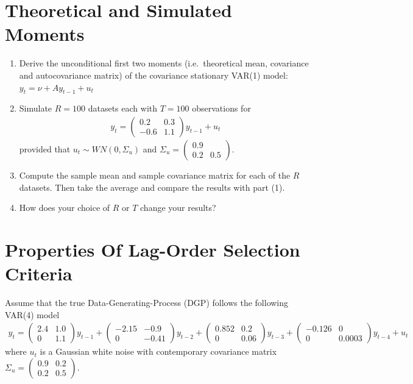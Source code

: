 \documentclass{article}
\begin{document}
\section[Theoretical and Simulated Moments]{Theoretical and Simulated Moments\label{ex:TheoreticalAndSimulatedMoments}}
\begin{enumerate}
 	\item Derive the unconditional first two moments (i.e.\ theoretical mean, covariance and autocovariance matrix) of the covariance stationary VAR{(1)} model: \(y_t = \nu + A y_{t-1} + u_t\)
 	\item Simulate \(R=100\) datasets each with \(T=100\) observations for
 	\begin{align*}
 	y_t = \begin{pmatrix}0.2 &0.3 \\-0.6 & 1.1 \end{pmatrix} y_{t-1}  + u_t
 	\end{align*}
 	provided that \(u_t \sim WN(0,\Sigma_u)\) and \(\Sigma_u = \begin{pmatrix}0.9 &  \\ 0.2 & 0.5 \end{pmatrix}\).
	\item Compute the sample mean and sample covariance matrix for each of the \(R\) datasets.
	Then take the average and compare the results with part (1).
	\item How does your choice of \(R\) or \(T\) change your results?

\end{enumerate}

\newpage


\section{Properties Of Lag-Order Selection Criteria}
Assume that the true Data-Generating-Process (DGP) follows the following VAR{(4)} model
\begin{align*}
y_t = \begin{pmatrix}
2.4 & 1.0\\
0 & 1.1
\end{pmatrix}
y_{t-1}+
\begin{pmatrix}
-2.15 & -0.9\\
0 & -0.41
\end{pmatrix}
y_{t-2}+
\begin{pmatrix}
0.852 & 0.2\\
0& 0.06
\end{pmatrix}
y_{t-3}+
\begin{pmatrix}
-0.126 & 0\\
0 & 0.0003
\end{pmatrix}
y_{t-4}
+ u_t
\end{align*}
where \(u_t\) is a Gaussian white noise with contemporary covariance matrix \(\Sigma_u = \begin{pmatrix}
0.9&0.2\\0.2&0.5
\end{pmatrix}\).
\end{document}
